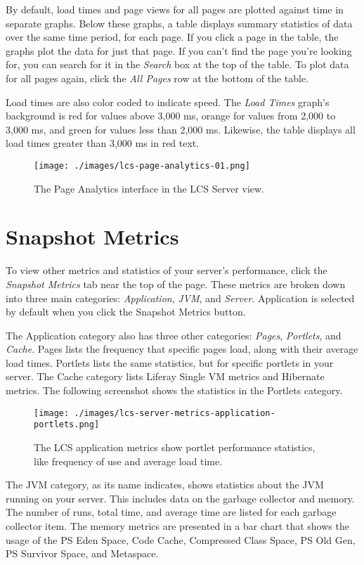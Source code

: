 By default, load times and page views for all pages are plotted against
time in separate graphs. Below these graphs, a table displays summary
statistics of data over the same time period, for each page. If you
click a page in the table, the graphs plot the data for just that page.
If you can't find the page you're looking for, you can search for it in
the \emph{Search} box at the top of the table. To plot data for all
pages again, click the \emph{All Pages} row at the bottom of the table.

Load times are also color coded to indicate speed. The \emph{Load Times}
graph's background is red for values above 3,000 ms, orange for values
from 2,000 to 3,000 ms, and green for values less than 2,000 ms.
Likewise, the table displays all load times greater than 3,000 ms in red
text.

\begin{figure}
\centering
\texttt{[image: ./images/lcs-page-analytics-01.png]}
\caption{The Page Analytics interface in the LCS Server view.}
\end{figure}

\section{Snapshot Metrics}\label{snapshot-metrics}

To view other metrics and statistics of your server's performance, click
the \emph{Snapshot Metrics} tab near the top of the page. These metrics
are broken down into three main categories: \emph{Application},
\emph{JVM}, and \emph{Server}. Application is selected by default when
you click the Snapshot Metrics button.

The Application category also has three other categories: \emph{Pages},
\emph{Portlets}, and \emph{Cache}. Pages lists the frequency that
specific pages load, along with their average load times. Portlets lists
the same statistics, but for specific portlets in your server. The Cache
category lists Liferay Single VM metrics and Hibernate metrics. The
following screenshot shows the statistics in the Portlets category.

\begin{figure}
\centering
\texttt{[image: ./images/lcs-server-metrics-application-portlets.png]}
\caption{The LCS application metrics show portlet performance
statistics, like frequency of use and average load time.}
\end{figure}

The JVM category, as its name indicates, shows statistics about the JVM
running on your server. This includes data on the garbage collector and
memory. The number of runs, total time, and average time are listed for
each garbage collector item. The memory metrics are presented in a bar
chart that shows the usage of the PS Eden Space, Code Cache, Compressed
Class Space, PS Old Gen, PS Survivor Space, and Metaspace.

